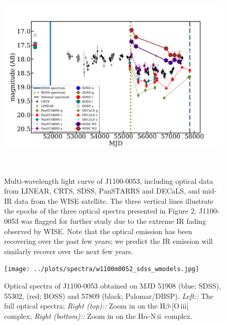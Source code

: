 \documentclass{nature}
\newcommand{\oiii}{[O\,{\sc iii}]\ }
\newcommand{\nii}{N\,{\sc ii}\ }
\begin{document}
\begin{figure}
  \centering
  \includegraphics[width=16.00cm, height=10.00cm, trim=0.0cm 0.0cm 0.0cm 0.0cm, clip]
  {../plots/lc/J110057_lc_20171204v1.png}
  \caption[]{
    Multi-wavelength light curve of J1100-0053,
    including optical data from LINEAR, CRTS, SDSS, PanSTARRS and
    DECaLS, and mid-IR data from the WISE satellite.  The three vertical
    lines illustrate the epochs of the three optical spectra presented
    in Figure 2.  J1100-0053 was flagged for further study due to the
    extreme IR fading observed by WISE.  Note that the optical emission
    has been recovering over the past few years; we predict the IR
    emission will similarly recover over the next few years.}
  \label{fig:J110057_LC_CRTS}
\end{figure}


\begin{figure}
  \centering
  \texttt{[image: ../plots/spectra/w1100m0052\_sdss\_wmodels.jpg]}
  \caption[]{
    Optical spectra of J1100-0053 obtained on MJD 51908 (blue; SDSS), 55302,
    (red; BOSS) and 57809 (black; Palomar/DBSP).  {\it Left::} The full
    optical spectra; {\it Right (top)::} Zoom in on the H$\beta$-\oiii
    complex; {\it Right (bottom)::} Zoom in on the H$\alpha$-\nii complex.
  }
  \label{fig:J110057_spectra}
\end{figure}
\end{document}
